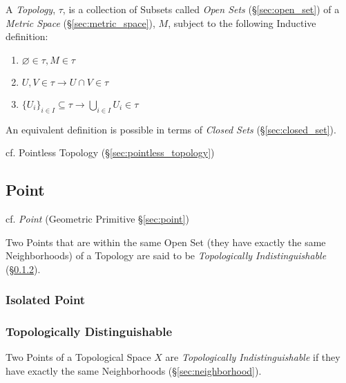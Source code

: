 A \emph{Topology}, $\tau$, is a collection of Subsets called
\emph{Open Sets} (\S\ref{sec:open_set}) of a \emph{Metric Space}
(\S\ref{sec:metric_space}), $M$, subject to the following Inductive
definition:
\begin{enumerate}
\item $\varnothing \in \tau, M \in \tau$
\item $U,V \in \tau \rightarrow U \cap V \in \tau$
\item $\{U_i\}_{i \in I} \subseteq \tau \rightarrow \bigcup_{i \in I}
  U_i \in \tau$
\end{enumerate}

An equivalent definition is possible in terms of \emph{Closed Sets}
(\S\ref{sec:closed_set}).

\fist cf. Pointless Topology (\S\ref{sec:pointless_topology})



\subsection{Point}\label{sec:topological_point}

cf. \emph{Point} (Geometric Primitive \S\ref{sec:point})

Two Points that are within the same Open Set (they have exactly the
same Neighborhoods) of a Topology are said to be \emph{Topologically
  Indistinguishable} (\S\ref{sec:topologically_distinguishable}).



\subsubsection{Isolated Point}\label{sec:isolated_point}

\subsubsection{Topologically Distinguishable}
\label{sec:topologically_distinguishable}

Two Points of a Topological Space $X$ are \emph{Topologically
  Indistinguishable} if they have exactly the same Neighborhoods
(\S\ref{sec:neighborhood}).



